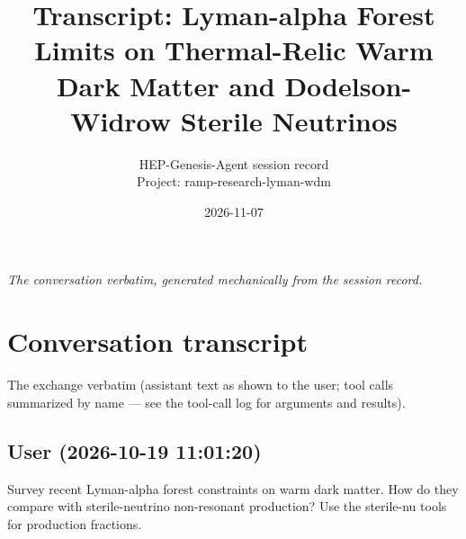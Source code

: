 \documentclass[11pt,a4paper]{article}
\title{Transcript: Lyman-alpha Forest Limits on Thermal-Relic Warm Dark Matter and Dodelson-Widrow Sterile Neutrinos}
\author{HEP-Genesis-Agent session record \\ \small Project: ramp-research-lyman-wdm}
\date{2026-11-07}
\begin{document}
\maketitle
\noindent\textit{\small The conversation verbatim, generated mechanically from the session record.}
\vspace{1em}



\appendix
\section{Conversation transcript}
\label{app:transcript}
The exchange verbatim (assistant text as shown to the user; tool calls summarized by name --- see the tool-call log for arguments and results).
\subsection*{User \small(2026-10-19 11:01:20)}
Survey recent Lyman-alpha forest constraints on warm dark matter. How do they compare with sterile-neutrino non-resonant production? Use the sterile-nu tools for production fractions.
\end{document}
